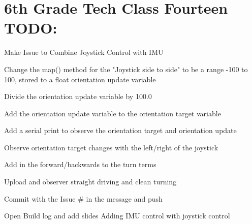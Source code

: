 \documentclass{article}
\begin{document}
\section{6th Grade Tech Class Fourteen TODO:}
\begin{todolist}
	\item Make Issue to Combine Joystick Control with IMU
	\item Change the map() method for the "Joystick side to side" to be a range -100 to 100, stored to a float orientation update variable
	\item Divide the orientation update variable by 100.0
	\item Add the orientation update variable to the orientation target variable 
	\item Add a serial print to observe the orientation target and orientation update
	\item Observe orientation target changes with the left/right of the joystick
	\item Add in the forward/backwards to the turn terms 
	\item Upload and observer straight driving and clean turning
	\item Commit with the Issue \# in the message and push
	\item Open Build log and add slides Adding IMU control with joystick control
\end{todolist}
\end{document}
